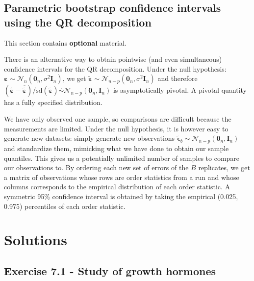 \documentclass[]{book}
\theoremstyle{definition}
\theoremstyle{definition}
\theoremstyle{definition}
\theoremstyle{remark}
\begin{document}
\hypertarget{parametric-bootstrap-confidence-intervals-using-the-qr-decomposition}{%
\subsection{Parametric bootstrap confidence intervals using the QR
decomposition}\label{parametric-bootstrap-confidence-intervals-using-the-qr-decomposition}}

This section contains \textbf{optional} material.

There is an alternative way to obtain pointwise (and even simultaneous)
confidence intervals for the QR decomposition. Under the null
hypothesis:
\(\boldsymbol{\varepsilon} \sim \mathcal{N}_{n}(\mathbf{0}_n, \sigma^2\mathbf{I}_n)\),
we get
\(\tilde{\boldsymbol{\varepsilon}} \sim \mathcal{N}_{n-p}(\mathbf{0}_n, \sigma^2\mathbf{I}_n)\)
and therefore
\((\tilde{\boldsymbol{\varepsilon}}- \overline{\boldsymbol{\tilde{\varepsilon}}})/\mathrm{sd}(\boldsymbol{\tilde{\varepsilon}}) \stackrel{\cdot}{\sim} \mathcal{N}_{n-p}(\mathbf{0}_n, \mathbf{I}_n)\)
is asymptotically pivotal. A pivotal quantity has a fully specified
distribution.

We have only observed one sample, so comparisons are difficult because
the measurements are limited. Under the null hypothesis, it is however
easy to generate new datasets: simply generate new observations
\(\tilde{\boldsymbol{\epsilon}}_b \sim \mathcal{N}_{n-p}(\mathbf{0}_n, \mathbf{I}_n)\)
and standardize them, mimicking what we have done to obtain our sample
quantiles. This gives us a potentially unlimited number of samples to
compare our observations to. By ordering each new set of errors of the
\(B\) replicates, we get a matrix of observations whose rows are order
statistics from a run and whose columns corresponds to the empirical
distribution of each order statistic. A symmetric 95\% confidence
interval is obtained by taking the empirical (0.025, 0.975) percentiles
of each order statistic.

\hypertarget{solutions-3}{%
\section{Solutions}\label{solutions-3}}

\hypertarget{exercise-7.1---study-of-growth-hormones}{%
\subsection{Exercise 7.1 - Study of growth
hormones}\label{exercise-7.1---study-of-growth-hormones}}
\end{document}

